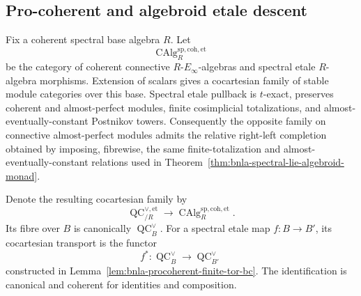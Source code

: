 \subsection{Pro-coherent and algebroid etale descent}

\begin{construction}
\label{con:bnla-relative-procoherent-etale-family}
Fix a coherent spectral base algebra $R$.  Let
\[
    \operatorname{CAlg}^{\mathrm{sp,coh,et}}_R
\]
be the category of coherent connective $R$-$E_\infty$-algebras and spectral
etale $R$-algebra morphisms.  Extension of scalars gives a cocartesian family
of stable module categories over this base.  Spectral etale pullback is
$t$-exact, preserves coherent and almost-perfect modules, finite
cosimplicial totalizations, and almost-eventually-constant Postnikov towers.
Consequently the opposite family on connective almost-perfect modules admits
the relative right-left completion obtained by imposing, fibrewise, the same
finite-totalization and almost-eventually-constant relations used in
Theorem~\ref{thm:bnla-spectral-lie-algebroid-monad}.

Denote the resulting cocartesian family by
\[
\boxed{
    \operatorname{QC}^{\vee,\mathrm{et}}_{/R}
    \longrightarrow
    \operatorname{CAlg}^{\mathrm{sp,coh,et}}_R.}
\]
Its fibre over $B$ is canonically $\operatorname{QC}^{\vee}_B$.  For a
spectral etale map $f:B\to B'$, its cocartesian transport is the functor
\[
    f^*:\operatorname{QC}^{\vee}_B
    \longrightarrow
    \operatorname{QC}^{\vee}_{B'}
\]
constructed in Lemma~\ref{lem:bnla-procoherent-finite-tor-bc}.  The
identification is canonical and coherent for identities and composition.
\end{construction}


